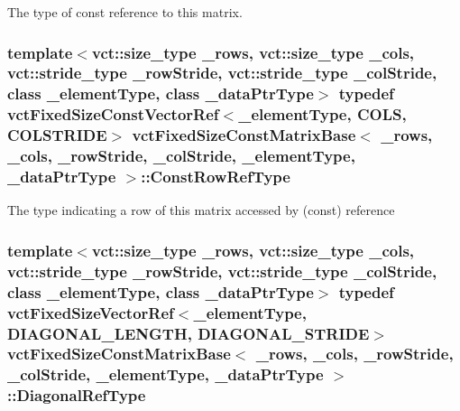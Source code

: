 The type of const reference to this matrix. \hypertarget{classvct_fixed_size_const_matrix_base_a74355396eec7437755398c2810e0df41}{
\subsubsection[{Const\-Row\-Ref\-Type}]{\setlength{\rightskip}{0pt plus 5cm}template$<$vct\-::size\-\_\-type \-\_\-rows, vct\-::size\-\_\-type \-\_\-cols, vct\-::stride\-\_\-type \-\_\-row\-Stride, vct\-::stride\-\_\-type \-\_\-col\-Stride, class \-\_\-element\-Type, class \-\_\-data\-Ptr\-Type$>$ typedef {\bf vct\-Fixed\-Size\-Const\-Vector\-Ref}$<$\-\_\-element\-Type, {\bf C\-O\-L\-S}, {\bf C\-O\-L\-S\-T\-R\-I\-D\-E}$>$ {\bf vct\-Fixed\-Size\-Const\-Matrix\-Base}$<$ \-\_\-rows, \-\_\-cols, \-\_\-row\-Stride, \-\_\-col\-Stride, \-\_\-element\-Type, \-\_\-data\-Ptr\-Type $>$\-::{\bf Const\-Row\-Ref\-Type}}}\label{classvct_fixed_size_const_matrix_base_a74355396eec7437755398c2810e0df41}
The type indicating a row of this matrix accessed by (const) reference \hypertarget{classvct_fixed_size_const_matrix_base_ae0b335e845233b49e01f24c1518ee6a1}{
\subsubsection[{Diagonal\-Ref\-Type}]{\setlength{\rightskip}{0pt plus 5cm}template$<$vct\-::size\-\_\-type \-\_\-rows, vct\-::size\-\_\-type \-\_\-cols, vct\-::stride\-\_\-type \-\_\-row\-Stride, vct\-::stride\-\_\-type \-\_\-col\-Stride, class \-\_\-element\-Type, class \-\_\-data\-Ptr\-Type$>$ typedef {\bf vct\-Fixed\-Size\-Vector\-Ref}$<$\-\_\-element\-Type, {\bf D\-I\-A\-G\-O\-N\-A\-L\-\_\-\-L\-E\-N\-G\-T\-H}, {\bf D\-I\-A\-G\-O\-N\-A\-L\-\_\-\-S\-T\-R\-I\-D\-E}$>$ {\bf vct\-Fixed\-Size\-Const\-Matrix\-Base}$<$ \-\_\-rows, \-\_\-cols, \-\_\-row\-Stride, \-\_\-col\-Stride, \-\_\-element\-Type, \-\_\-data\-Ptr\-Type $>$\-::{\bf Diagonal\-Ref\-Type}}}\label{classvct_fixed_size_const_matrix_base_ae0b335e845233b49e01f24c1518ee6a1}
